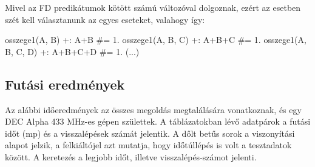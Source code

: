 Mivel az FD predikátumok kötött számú változóval dolgoznak, ezért az 
esetben szét kell választanunk az egyes eseteket, valahogy így:

\begin{prologcode}
osszege1(A, B) +:              A+B #= 1.
osszege1(A, B, C) +:           A+B+C #= 1.
osszege1(A, B, C, D) +:        A+B+C+D #= 1.
(...)
\end{prologcode}

\subsection{Futási eredmények}

Az alábbi időeredmények az összes megoldás megtalálására vonatkoznak, és egy
DEC Alpha 433 MHz-es gépen születtek. A táblázatokban lévő adatpárok a futási
időt (mp) és a visszalépések számát jelentik. A dőlt betűs sorok a viszonyítási
alapot jelzik, a felkiáltójel azt mutatja, hogy időtúllépés is volt a tesztadatok
között. A keretezés a legjobb időt, illetve visszalépés-számot jelenti.

